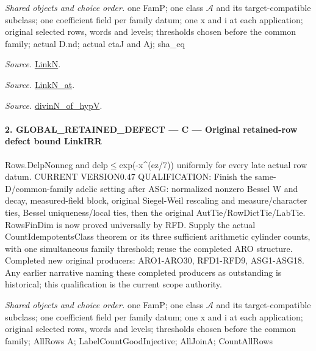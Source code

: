 \documentclass[11pt,a4paper]{article}
\numberwithin{equation}{section}
\theoremstyle{remark}\newtheorem{remark}[theorem]{Remark}
\begin{document}
\emph{Shared objects and choice order.} one FamP; one class $\mathcal A$ and its target-compatible subclass; one coefficient field per family datum; one x and i at each application; original selected rows, words and levels; thresholds chosen before the common family; actual D.nd; actual etaJ and Aj; sha\_\allowbreak eq

\emph{Source.} \href{https://github.com/CocoSgt/riemann-hypothesis-lean/blob/7cbf7a0c32fca1badf05931879a37c3f8a2b03b4/src/Formalism/SharpRestriction/GlobalTheoremInputs.lean#L45-L48}{LinkN}.

\emph{Source.} \href{https://github.com/CocoSgt/riemann-hypothesis-lean/blob/7cbf7a0c32fca1badf05931879a37c3f8a2b03b4/src/Formalism/SharpRestriction/GlobalTheoremInputs.lean#L40-L44}{LinkN\_\allowbreak at}.

\emph{Source.} \href{https://github.com/CocoSgt/riemann-hypothesis-lean/blob/7cbf7a0c32fca1badf05931879a37c3f8a2b03b4/src/Development/AutomorphicArithmetic/CharacterBoxes/DivinNOfHypV.lean#L117-L134}{divinN\_\allowbreak of\_\allowbreak hypV}.



\paragraph{2. GLOBAL\_\allowbreak RETAINED\_\allowbreak DEFECT — C — Original retained-row defect bound LinkIRR}

Rows.DelpNonneg and delp$\le$exp(-x\textasciicircum{}(ez/7)) uniformly for every late actual row datum. CURRENT VERSION0.47 QUALIFICATION: Finish the same-D/common-family adelic setting after ASG: normalized nonzero Bessel W and decay, measured-field block, original Siegel-Weil rescaling and measure/character ties, Bessel uniqueness/local ties, then the original AutTie/RowDictTie/LabTie. RowsFinDim is now proved universally by RFD. Supply the actual CountIdempotentsClass theorem or its three sufficient arithmetic cylinder counts, with one simultaneous family threshold; reuse the completed ARO structure. Completed new original producers: ARO1-ARO30, RFD1-RFD9, ASG1-ASG18. Any earlier narrative naming these completed producers as outstanding is historical; this qualification is the current scope authority.

\emph{Shared objects and choice order.} one FamP; one class $\mathcal A$ and its target-compatible subclass; one coefficient field per family datum; one x and i at each application; original selected rows, words and levels; thresholds chosen before the common family; AllRows A; LabelCountGoodInjective; AllJoinA; CountAllRows
\end{document}
